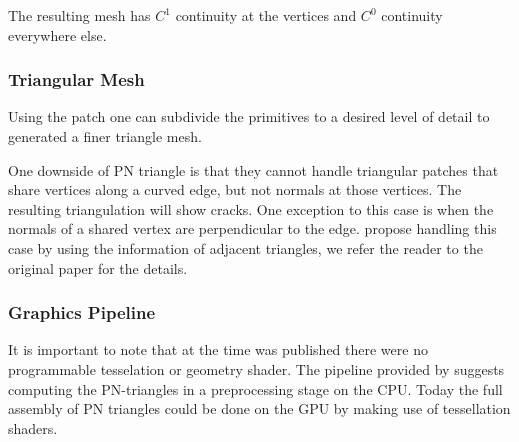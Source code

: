 The resulting mesh has $C^1$ continuity at the vertices and $C^0$ continuity everywhere else. 

\subsubsection*{Triangular Mesh}
Using the patch one can subdivide the primitives to a desired level of detail to generated a finer triangle mesh. 

One downside of PN triangle is that they cannot handle triangular patches that share vertices along a curved edge, but not normals at those vertices. The resulting triangulation will show cracks. One exception to this case is when the normals of a shared vertex are perpendicular to the edge. \citeauthor{vlachos2001curved} propose handling this case by using the information of adjacent triangles, we refer the reader to the original paper for the details.

\subsubsection*{Graphics Pipeline}
It is important to note that at the time \textcite{vlachos2001curved} was published there were no programmable tesselation or geometry shader. The pipeline provided by \citeauthor{vlachos2001curved} suggests computing the PN-triangles in a preprocessing stage on the CPU. Today the full assembly of PN triangles could be done on the GPU by making use of tessellation shaders.\\

